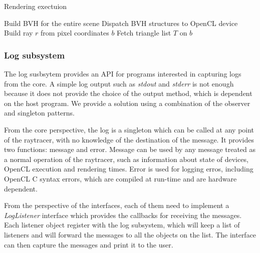 \documentclass[a4paper]{sbgames}               %
\begin{document}
\begin{algorithm}
\caption{Rendering exectuion}
\label{alg:rendering}
\begin{algorithmic}[1]
\State Build BVH for the entire scene
\State Dispatch BVH structures to OpenCL device
\EndProcedure
{}
\State Build ray $r$ from pixel coordinates
\Return $b$
\EndIf
\EndFor
\State Fetch triangle list $T$ on $b$
\EndIf
\EndFor
\EndFor
\EndProcedure
\end{algorithmic}
\end{algorithm}


\subsubsection{Log subsystem}

The log susbsytem provides an API for programs interested in capturing
logs from the core. A simple log output such as \emph{stdout} and
\emph{stderr} is not enough because it does not provide the choice of
the output method, which is dependent on the host program. We provide
a solution using a combination of the observer and singleton patterns.

From the core perspective, the log is a singleton which can be called
at any point of the raytracer, with no knowledge of the destination of
the message. It provides two functions: message and error. Message can
be used by any message treated as a normal operation of the raytracer,
such as information about state of devices, OpenCL execution and
rendering times. Error is used for logging erros, including OpenCL C
syntax errors, which are compiled at run-time and are hardware
dependent.

From the perspective of the interfaces, each of them need to implement
a \emph{LogListener} interface which provides the callbacks for
receiving the messages. Each listener object register with the log
subsystem, which will keep a list of listeners and will forward the
messages to all the objects on the list. The interface can then
capture the messages and print it to the user.
\end{document}
